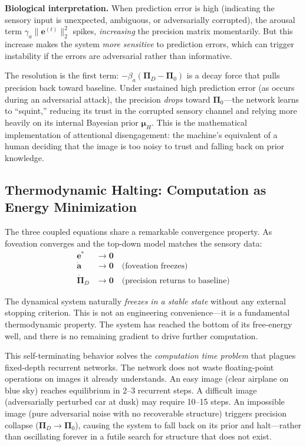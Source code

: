 \documentclass[12pt,a4paper]{article}
\begin{document}
\textbf{Biological interpretation.} When prediction error is high (indicating
the sensory input is unexpected, ambiguous, or adversarially corrupted), the
arousal term $\gamma_a \|\mathbf{e}^{(t)}\|_2^2$ spikes, \textit{increasing}
the precision matrix momentarily. But this increase makes the system
\textit{more sensitive} to prediction errors, which can trigger instability
if the errors are adversarial rather than informative.

The resolution is the first term: $-\beta_a(\bm{\Pi}_D - \bm{\Pi}_0)$ is a
decay force that pulls precision back toward baseline. Under sustained high
prediction error (as occurs during an adversarial attack), the precision
\textit{drops} toward $\bm{\Pi}_0$---the network learns to ``squint,''
reducing its trust in the corrupted sensory channel and relying more heavily
on its internal Bayesian prior $\bm{\mu}_H$. This is the mathematical
implementation of attentional disengagement: the machine's equivalent of a
human deciding that the image is too noisy to trust and falling back on
prior knowledge.

\subsection{Thermodynamic Halting: Computation as Energy Minimization}
\label{sec:halting}

The three coupled equations share a remarkable convergence property. As
foveation converges and the top-down model matches the sensory data:
\begin{align}
  \mathbf{e}^* &\to \mathbf{0} \\
  \dot{\mathbf{a}} &\to \mathbf{0} \quad \text{(foveation freezes)} \\
  \dot{\bm{\Pi}}_D &\to \mathbf{0} \quad \text{(precision returns to baseline)}
\end{align}

The dynamical system naturally \textit{freezes in a stable state} without
any external stopping criterion. This is not an engineering convenience---it
is a fundamental thermodynamic property. The system has reached the bottom of
its free-energy well, and there is no remaining gradient to drive further
computation.

This self-terminating behavior solves the \textit{computation time problem}
that plagues fixed-depth recurrent networks. The network does not waste
floating-point operations on images it already understands. An easy image
(clear airplane on blue sky) reaches equilibrium in 2--3 recurrent steps.
A difficult image (adversarially perturbed car at dusk) may require 10--15
steps. An impossible image (pure adversarial noise with no recoverable
structure) triggers precision collapse ($\bm{\Pi}_D \to \bm{\Pi}_0$),
causing the system to fall back on its prior and halt---rather than
oscillating forever in a futile search for structure that does not exist.
\end{document}
